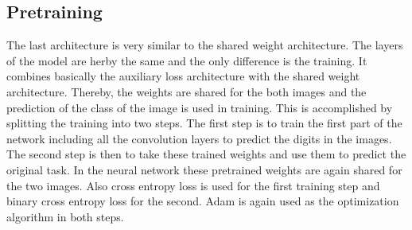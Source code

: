 \documentclass[12pt]{article}
\begin{document}
\subsection{Pretraining}
The last architecture is very similar to the shared weight architecture.
The layers of the model are herby the same and the only difference is the training.
It combines basically the auxiliary loss architecture with the shared weight architecture.
Thereby, the weights are shared for the both images and the prediction of the class of the image is used in training.
This is accomplished by splitting the training into two steps.
The first step is to train the first part of the network including all the convolution layers to predict the digits in the images.
The second step is then to take these trained weights and use them to predict the original task.
In the neural network these pretrained weights are again shared for the two images.
Also cross entropy loss is used for the first training step and binary cross entropy loss for the second.
Adam is again used as the optimization algorithm in both steps. 
\end{document}
